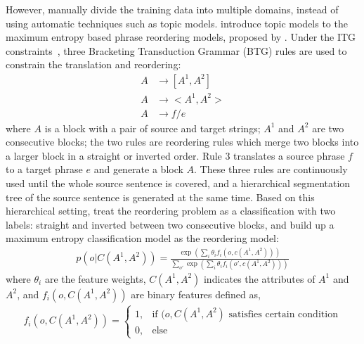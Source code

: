 However, \citet{Chen-2013} manually divide the training data into multiple domains, instead of using automatic techniques such as topic models. \citet{wang-14} introduce topic models to the maximum entropy based phrase reordering models, proposed by \citet{Xiong-2006}. Under the ITG constraints~\citep{Wu-1997}, three Bracketing Transduction Grammar (BTG) rules are used to constrain the translation and reordering:
\begin{align}
A &\rightarrow [A^1, A^2]\\
A &\rightarrow <A^1, A^2>\\
A &\rightarrow f/e
\end{align}
where $A$ is a block with a pair of source and target strings; $A^1$ and $A^2$ are two consecutive blocks; the two rules are reordering rules which merge two blocks into a larger block in a straight or inverted order. Rule 3 translates a source phrase $f$ to a target phrase $e$ and generate a block $A$. These three rules are continuously used until the whole source sentence is covered, and a hierarchical segmentation tree of the source sentence is generated at the same time. Based on this hierarchical setting, \citet{Xiong-2006} treat the reordering problem as a classification with two labels: straight and inverted between two consecutive blocks, and build up a maximum entropy classification model as the reordering model:
\begin{align}
p(o|C(A^1, A^2)) = \frac{\exp(\sum_i \theta_i f_i(o, c(A^1, A^2)))}{\sum_{o'} \exp(\sum_i \theta_i f_i(o', c(A^1, A^2)))}
\end{align}
where $\theta_i$ are the feature weights, $C(A^1, A^2)$ indicates the attributes of $A^1$ and $A^2$, and $f_i(o, C(A^1, A^2))$ are binary features defined as, 
\begin{align}
f_i(o, C(A^1,A^2)) = \begin{cases}
1, &\text{if $(o,C(A^1, A^2)$ satisfies certain condition} \\
0, &\text{else}
\end{cases}
\end{align}

